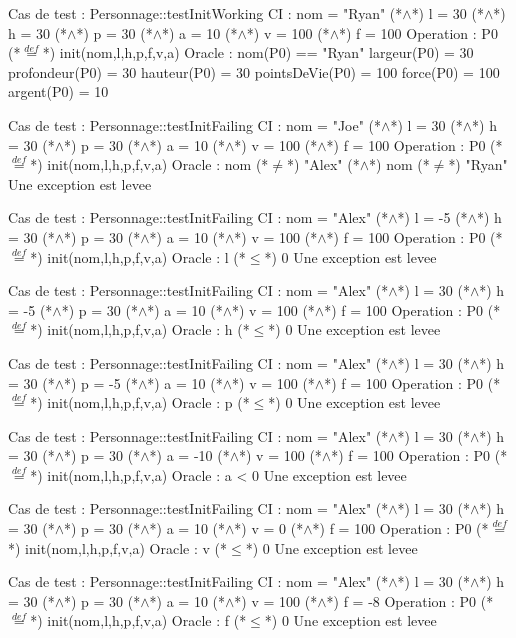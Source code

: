 \documentclass[a4paper, 11pt, notitlepage]{report}
\begin{document}
\begin{Test}
Cas de test : Personnage::testInitWorking
CI : nom = "Ryan" (*$\land$*) l = 30 (*$\land$*) h = 30 (*$\land$*) p = 30 (*$\land$*) a = 10 (*$\land$*) v = 100 (*$\land$*) f = 100
Operation : P0 (*$\stackrel{def}{=}$*) init(nom,l,h,p,f,v,a)
Oracle : 
	nom(P0) == "Ryan"
	largeur(P0) =	30
	profondeur(P0) = 30
	hauteur(P0) = 30
	pointsDeVie(P0) = 100
	force(P0) = 100
	argent(P0) = 10
	
	
Cas de test : Personnage::testInitFailing 
CI : nom = "Joe" (*$\land$*) l = 30 (*$\land$*) h = 30 (*$\land$*) p = 30 (*$\land$*) a = 10 (*$\land$*) v = 100 (*$\land$*) f = 100
Operation : P0 (*$\stackrel{def}{=}$*) init(nom,l,h,p,f,v,a)
Oracle : 
	nom (*$\ne$*) "Alex" (*$\land$*) nom (*$\ne$*) "Ryan"
	Une exception est levee
	
Cas de test : Personnage::testInitFailing 
CI : nom = "Alex" (*$\land$*) l = -5 (*$\land$*) h = 30 (*$\land$*) p = 30 (*$\land$*) a = 10 (*$\land$*) v = 100 (*$\land$*) f = 100
Operation : P0 (*$\stackrel{def}{=}$*) init(nom,l,h,p,f,v,a)
Oracle : 
	l (*$\leq$*) 0
	Une exception est levee
	
Cas de test : Personnage::testInitFailing 
CI : nom = "Alex" (*$\land$*) l = 30 (*$\land$*) h = -5 (*$\land$*) p = 30 (*$\land$*) a = 10 (*$\land$*) v = 100 (*$\land$*) f = 100
Operation : P0 (*$\stackrel{def}{=}$*) init(nom,l,h,p,f,v,a)
Oracle : 
	h (*$\leq$*) 0
	Une exception est levee
	
Cas de test : Personnage::testInitFailing 
CI : nom = "Alex" (*$\land$*) l = 30 (*$\land$*) h = 30 (*$\land$*) p = -5 (*$\land$*) a = 10 (*$\land$*) v = 100 (*$\land$*) f = 100
Operation : P0 (*$\stackrel{def}{=}$*) init(nom,l,h,p,f,v,a)
Oracle : 
	p (*$\leq$*) 0
	Une exception est levee
	
Cas de test : Personnage::testInitFailing 
CI : nom = "Alex" (*$\land$*) l = 30 (*$\land$*) h = 30 (*$\land$*) p = 30 (*$\land$*) a = -10 (*$\land$*) v = 100 (*$\land$*) f = 100
Operation : P0 (*$\stackrel{def}{=}$*) init(nom,l,h,p,f,v,a)
Oracle : 
	a < 0
	Une exception est levee
	
Cas de test : Personnage::testInitFailing 
CI : nom = "Alex" (*$\land$*) l = 30 (*$\land$*) h = 30 (*$\land$*) p = 30 (*$\land$*) a = 10 (*$\land$*) v = 0 (*$\land$*) f = 100
Operation : P0 (*$\stackrel{def}{=}$*) init(nom,l,h,p,f,v,a)
Oracle : 
	v (*$\leq$*) 0
	Une exception est levee
	
Cas de test : Personnage::testInitFailing 
CI : nom = "Alex" (*$\land$*) l = 30 (*$\land$*) h = 30 (*$\land$*) p
= 30 (*$\land$*) a = 10 (*$\land$*) v = 100 (*$\land$*) f = -8
Operation : P0 (*$\stackrel{def}{=}$*) init(nom,l,h,p,f,v,a)
Oracle : 
	f (*$\leq$*) 0
	Une exception est levee


\end{Test}
\end{document}

